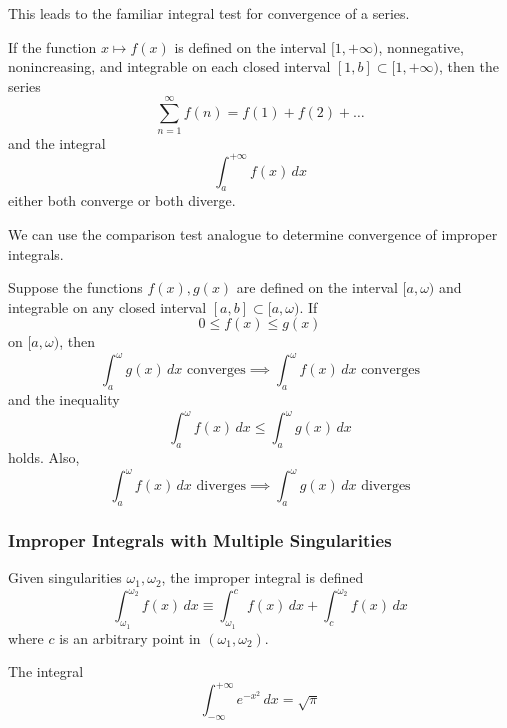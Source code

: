       This leads to the familiar integral test for convergence of a series. 

      \begin{theorem}
      If the function $x \mapsto f(x)$ is defined on the interval $[1, +\infty)$, nonnegative, nonincreasing, and integrable on each closed interval $[1, b] \subset [1, +\infty)$, then the series 
      \[\sum_{n=1}^\infty f(n) = f(1) + f(2) + \ldots\]
      and the integral 
      \[\int_a^{+\infty} f(x)\,dx\]
      either both converge or both diverge. 
      \end{theorem}

      We can use the comparison test analogue to determine convergence of improper integrals. 

      \begin{theorem}
      Suppose the functions $f(x), g(x)$ are defined on the interval $[a, \omega)$ and integrable on any closed interval $[a, b] \subset [a, \omega)$. If 
      \[0 \leq f(x) \leq g(x)\]
      on $[a, \omega)$, then 
      \[\int_a^\omega g(x)\,dx \text{ converges} \implies \int_a^\omega f(x)\,dx \text{ converges}\]
      and the inequality 
      \[\int_a^\omega f(x)\,dx \leq \int_a^\omega g(x)\,dx\]
      holds. Also, 
      \[\int_a^\omega f(x)\,dx \text{ diverges} \implies \int_a^\omega g(x)\,dx \text{ diverges}\]
      \end{theorem}
    
    \subsubsection{Improper Integrals with Multiple Singularities}

      \begin{definition}
        Given singularities $\omega_1, \omega_2$, the improper integral is defined
        \[\int_{\omega_1}^{\omega_2} f(x)\,dx \equiv \int_{\omega_1}^c f(x)\,dx + \int_c^{\omega_2} f(x)\,dx\]
        where $c$ is an arbitrary point in $(\omega_1, \omega_2)$. 
      \end{definition}

    \begin{example}
    The integral 
    \[\int_{-\infty}^{+\infty} e^{-x^2}\,dx = \sqrt{\pi}\]
    \end{example}

